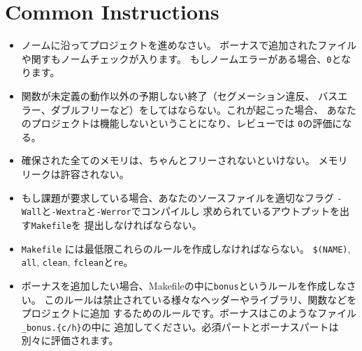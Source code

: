 
\chapter{Common Instructions}
    \begin{itemize}

      \item ノームに沿ってプロジェクトを進めなさい。
        ボーナスで追加されたファイルや関すもノームチェックが入ります。
        もしノームエラーがある場合、\texttt{0}となります。

      \item 関数が未定義の動作以外の予期しない終了（セグメーション違反、
        バスエラー、ダブルフリーなど）をしてはならない。これが起こった場合、
        あなたのプロジェクトは機能しないということになり、レビューでは
        \texttt{0}の評価になる。

      \item 確保された全てのメモリは、ちゃんとフリーされないといけない。
        メモリリークは許容されない。

      \item もし課題が要求している場合、あなたのソースファイルを適切なフラグ
        \texttt{-Wall}と\texttt{-Wextra}と\texttt{-Werror}でコンパイルし
        求められているアウトプットを出す\texttt{Makefile}を
        提出しなければならない。

      \item \texttt{Makefile} には最低限これらのルールを作成しなければならない。
        \texttt{\$(NAME)}, \texttt{all}, \texttt{clean},
        \texttt{fclean}と\texttt{re}。

      \item ボーナスを追加したい場合、Makefileの中に\texttt{bonus}というルールを作成しなさい。
        このルールは禁止されている様々なヘッダーやライブラリ、関数などをプロジェクトに追加
        するためのルールです。ボーナスはこのようなファイル\texttt{\*\_bonus.\{c/h\}}の中に
        追加してください。必須パートとボーナスパートは別々に評価されます。


\end{itemize}
